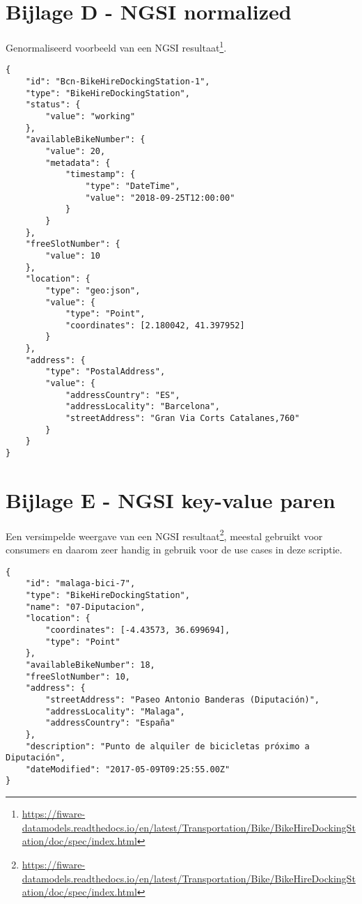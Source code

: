 \begin{appendices}
\clearpage
\section*{Bijlage D - NGSI normalized}
Genormaliseerd voorbeeld van een NGSI resultaat\footnote{\url{https://fiware-datamodels.readthedocs.io/en/latest/Transportation/Bike/BikeHireDockingStation/doc/spec/index.html}}.
\begin{code}
\begin{verbatim}
{
    "id": "Bcn-BikeHireDockingStation-1",
    "type": "BikeHireDockingStation",
    "status": {
        "value": "working"
    },
    "availableBikeNumber": {
        "value": 20,
        "metadata": {
            "timestamp": {
                "type": "DateTime",
                "value": "2018-09-25T12:00:00"
            }
        }
    },
    "freeSlotNumber": {
        "value": 10
    },
    "location": {
        "type": "geo:json",
        "value": {
            "type": "Point",
            "coordinates": [2.180042, 41.397952]
        }
    },
    "address": {
        "type": "PostalAddress",
        "value": {
            "addressCountry": "ES",
            "addressLocality": "Barcelona",
            "streetAddress": "Gran Via Corts Catalanes,760"
        }
    }
}

\end{verbatim}
\end{code}

\clearpage
\section*{Bijlage E - NGSI key-value paren}
Een versimpelde weergave van een NGSI resultaat\footnote{\url{https://fiware-datamodels.readthedocs.io/en/latest/Transportation/Bike/BikeHireDockingStation/doc/spec/index.html}}, meestal gebruikt voor consumers en daarom zeer handig in gebruik voor de use cases in deze scriptie.
\begin{code}
\begin{verbatim}
{
    "id": "malaga-bici-7",
    "type": "BikeHireDockingStation",
    "name": "07-Diputacion",
    "location": {
        "coordinates": [-4.43573, 36.699694],
        "type": "Point"
    },
    "availableBikeNumber": 18,
    "freeSlotNumber": 10,
    "address": {
        "streetAddress": "Paseo Antonio Banderas (Diputación)",
        "addressLocality": "Malaga",
        "addressCountry": "España"
    },
    "description": "Punto de alquiler de bicicletas próximo a Diputación",
    "dateModified": "2017-05-09T09:25:55.00Z"
}
\end{verbatim}
\end{code}

\end{appendices}

